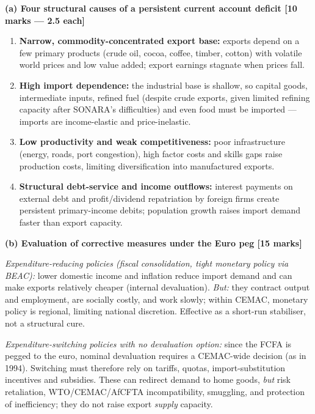 \documentclass[11pt]{article}
\begin{document}
\begin{corrige}
\textbf{(a) Four structural causes of a persistent current account deficit [10 marks — 2.5 each]}
\begin{enumerate}
\item \textbf{Narrow, commodity-concentrated export base:} exports depend on a few primary products (crude oil, cocoa, coffee, timber, cotton) with volatile world prices and low value added; export earnings stagnate when prices fall.
\item \textbf{High import dependence:} the industrial base is shallow, so capital goods, intermediate inputs, refined fuel (despite crude exports, given limited refining capacity after SONARA's difficulties) and even food must be imported — imports are income-elastic and price-inelastic.
\item \textbf{Low productivity and weak competitiveness:} poor infrastructure (energy, roads, port congestion), high factor costs and skills gaps raise production costs, limiting diversification into manufactured exports.
\item \textbf{Structural debt-service and income outflows:} interest payments on external debt and profit/dividend repatriation by foreign firms create persistent primary-income debits; population growth raises import demand faster than export capacity.
\end{enumerate}

\textbf{(b) Evaluation of corrective measures under the Euro peg [15 marks]}

\emph{Expenditure-reducing policies (fiscal consolidation, tight monetary policy via BEAC):} lower domestic income and inflation reduce import demand and can make exports relatively cheaper (internal devaluation). \emph{But:} they contract output and employment, are socially costly, and work slowly; within CEMAC, monetary policy is regional, limiting national discretion. Effective as a short-run stabiliser, not a structural cure.

\emph{Expenditure-switching policies with no devaluation option:} since the FCFA is pegged to the euro, nominal devaluation requires a CEMAC-wide decision (as in 1994). Switching must therefore rely on tariffs, quotas, import-substitution incentives and subsidies. These can redirect demand to home goods, \emph{but} risk retaliation, WTO/CEMAC/AfCFTA incompatibility, smuggling, and protection of inefficiency; they do not raise export \emph{supply} capacity.


\end{corrige}
\end{document}
